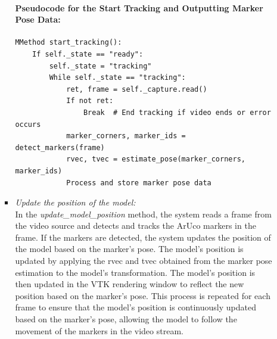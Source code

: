 \documentclass[12pt]{article}
\begin{document}
\begin{enumerate}
\begin{enumerate}
\begin{itemize}
                                    \paragraph{Pseudocode for the Start Tracking and Outputting Marker Pose Data:}
                                    \begin{verbatim}
MMethod start_tracking():
    If self._state == "ready":
        self._state = "tracking"
        While self._state == "tracking":
            ret, frame = self._capture.read()
            If not ret:
                Break  # End tracking if video ends or error occurs
            marker_corners, marker_ids = detect_markers(frame)
            rvec, tvec = estimate_pose(marker_corners, marker_ids)
            Process and store marker pose data
                              \end{verbatim}
                              \item \textit{Update the position of the model:}
                                    \\
                                    In the \emph{update\_model\_position} method, the system reads a frame from the video source and detects and tracks the ArUco markers in the frame. If the markers are detected, the system updates the position of the model based on the marker's pose. The model's position is updated by applying the \gls{rvec} and \gls{tvec} obtained from the marker pose estimation to the model's transformation. The model's position is then updated in the VTK rendering window to reflect the new position based on the marker's pose. This process is repeated for each frame to ensure that the model's position is continuously updated based on the marker's pose, allowing the model to follow the movement of the markers in the video stream.

\end{itemize}
\end{enumerate}
\end{enumerate}
\end{document}
